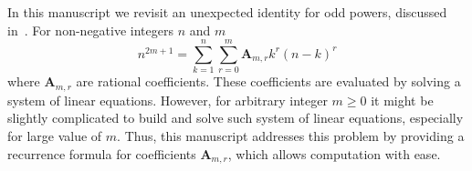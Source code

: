 In this manuscript we revisit an unexpected identity for odd powers, discussed
in~\cite{unusual_identity_for_odd_powers}.
For non-negative integers $n$ and $m$
\[
    n^{2m+1} = \sum_{k=1}^{n} \sum_{r=0}^{m} \mathbf{A}_{m,r} k^r (n-k)^r
\]
where $\mathbf{A}_{m,r}$ are rational coefficients.
These coefficients are evaluated by solving a system of linear equations.
However, for arbitrary integer $m\geq 0$ it might be slightly complicated
to build and solve such system of linear equations,
especially for large value of $m$.
Thus, this manuscript addresses this problem by providing a recurrence formula for coefficients $\mathbf{A}_{m,r}$,
which allows computation with ease.
